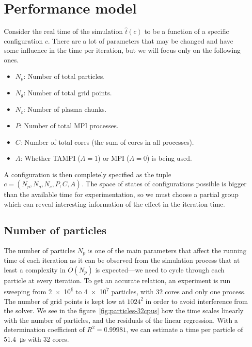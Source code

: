 %

\section{Performance model}

Consider the real time of the simulation $\hat t(c)$ to be a function of a 
specific configuration $c$. There are a lot of parameters that may be changed 
and have some influence in the time per iteration, but we will focus only on the 
following ones.
%
\begin{itemize}
\item $N_p$: Number of total particles.
\item $N_g$: Number of total grid points.
\item $N_c$: Number of plasma chunks.
\item $P$: Number of total MPI processes.
\item $C$: Number of total cores (the sum of cores in all processes).
\item $A$: Whether TAMPI ($A = 1$) or MPI ($A=0$) is being used.
\end{itemize}
%
A configuration is then completely specified as the tuple $c = (N_p, N_g, N_c, 
P, C, A)$. The space of states of configurations possible is bigger than the 
available time for experimentation, so we must choose a partial group which can 
reveal interesting information of the effect in the iteration time.
%
\subsection{Number of particles}

The number of particles $N_p$ is one of the main parameters that affect the
running time of each iteration as it can be observed from the simulation process 
that at least a complexity in $O(N_p)$ is expected---we need to cycle through 
each particle at every iteration. To get an accurate relation, an experiment is 
run sweeping from \num{2e6} to \num{4e7} particles, with 32 cores and only one 
process. The number of grid points is kept low at $1024^2$ in order to avoid 
interference from the solver. We see in the figure~\ref{fig:particles-32cpus} 
how the time scales linearly with the number of particles, and the residuals of 
the linear regression. With a determination coefficient of $R^2 = 0.99981$, we 
can estimate a time per particle of \SI{51.4}{\micro\second} with 32 cores.

